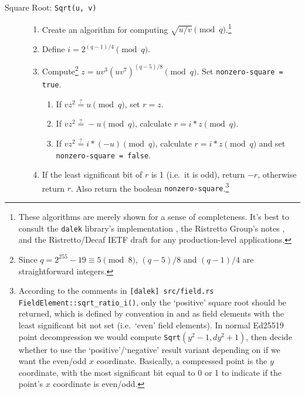 \begin{description}
    \item [Square Root: {\tt Sqrt(u, v)}] \hfill
        \begin{enumerate}
            \item Create an algorithm for computing $\sqrt{u/v} \pmod q$.\footnote{These algorithms are merely shown for a sense of completeness. It's best to consult the {\tt dalek} library's implementation \cite{dalek-curve25519-lib}, the Ristretto Group's notes \cite{ristretto}, and the Ristretto/Decaf IETF draft \cite{ristretto-decaf-ietf} for any production-level applications.}
            
            \item Define $i = 2^{(q-1)/4} \pmod q$.

            \item Compute\footnote{Since $q = 2^{255}-19 \equiv 5 \pmod{8}$, $(q-5)/8$ and $(q-1)/4$ are straightforward integers.} \(z = u v^3 (u v^7)^{(q-5)/8} \pmod q\). Set {\tt nonzero-square = true}.
            \begin{enumerate}
                \item If \(v z^2 \stackrel{?}{=} u \pmod q\), set \(r = z\).
                \item If \(v z^2 \stackrel{?}{=} -u \pmod q\), calculate \(r = i*z \pmod q\).
                \item If \(v z^2 \stackrel{?}{=} i*(-u) \pmod q\), calculate \(r = i*z \pmod q\) and set {\tt nonzero-square = false}.
            \end{enumerate}

            \item If the least significant bit of $r$ is 1 (i.e.\ it is odd), return $-r$, otherwise return $r$. Also return the boolean {\tt nonzero-square}.\footnote{\label{footnote:point-comp-positive-convention-normal-decompression}According to the comments in {\tt [dalek] src/field.rs FieldElement::sqrt\_ratio\_i()}, only the `positive' square root should be returned, which is defined by convention in \cite{Bernstein2012-high-speed-high-security-ed25519} and \cite{ristretto-decaf-ietf} as field elements with the least significant bit not set (i.e.\ `even' field elements). In normal Ed25519 point decompression \cite{Bernstein2012-high-speed-high-security-ed25519} we would compute {\tt Sqrt}$(y^2 - 1, d y^2 + 1)$, then decide whether to use the `positive'/`negative' result variant depending on if we want the even/odd $x$ coordinate. Basically, a compressed point is the $y$ coordinate, with the most significant bit equal to 0 or 1 to indicate if the point's $x$ coordinate is even/odd.}
        \end{enumerate}


\end{description}
